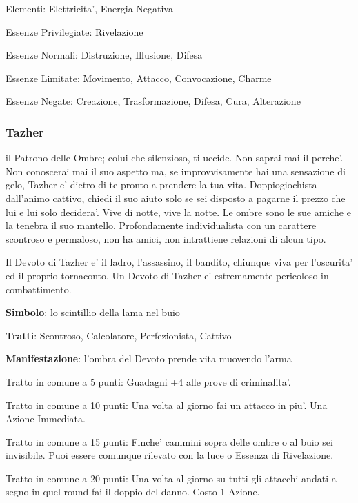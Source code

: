 \documentclass[a4paper,11pt,twoside,openany]{book}
\begin{document}
{		\bigskip
		
		Elementi: Elettricita', Energia Negativa
		
		\bigskip
		
		Essenze Privilegiate: Rivelazione
		
		Essenze Normali: Distruzione, Illusione, Difesa
		
		Essenze Limitate: Movimento, Attacco, Convocazione, Charme
		
		Essenze Negate: Creazione, Trasformazione, Difesa, Cura, Alterazione
		
		\subsubsection{Tazher}
		
		\label{tazher}
		
		il Patrono delle Ombre; colui che silenzioso, ti uccide. Non saprai mai il perche'. Non conoscerai mai il suo aspetto ma, se improvvisamente hai una sensazione di gelo, Tazher e' dietro di te pronto a prendere la tua vita. Doppiogiochista dall'animo cattivo, chiedi il suo aiuto solo se sei disposto a pagarne il prezzo che lui e lui solo decidera'. Vive di notte, vive la notte. Le ombre sono le sue amiche e la tenebra il suo mantello. Profondamente individualista con un carattere scontroso e permaloso, non ha amici, non intrattiene relazioni di alcun tipo.
		
		Il Devoto di Tazher e' il ladro, l'assassino, il bandito, chiunque viva per l'oscurita' ed il proprio tornaconto. Un Devoto di Tazher e' estremamente pericoloso in combattimento.
		
		\textbf{Simbolo}: lo scintillio della lama nel buio
		
		\textbf{Tratti}: Scontroso, Calcolatore, Perfezionista, Cattivo
		
		\textbf{Manifestazione}: l'ombra del Devoto prende vita muovendo l'arma
		
		\bigskip
		
		Tratto in comune a 5 punti: Guadagni +4 alle prove di criminalita'.
		
		Tratto in comune a 10 punti: Una volta al giorno fai un attacco in piu'. Una Azione Immediata.
		
		Tratto in comune a 15 punti: Finche' cammini sopra delle ombre o al buio sei invisibile. Puoi essere comunque rilevato con la luce o Essenza di Rivelazione.
		
		Tratto in comune a 20 punti: Una volta al giorno su tutti gli attacchi andati a segno in quel round fai il doppio del danno. Costo 1 Azione.
		
}
\end{document}
